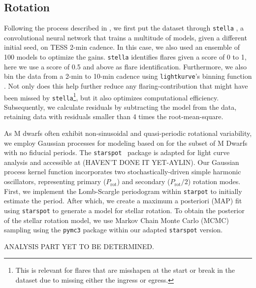 \subsection{Rotation}
Following the process described in \citet{023AJ....165..192G}, we first put the
dataset through \texttt{stella} \citep{FeinsteinFlare2020,FeinsteinStella2020},
a convolutional neural network that trains a multitude of models, given a
different initial seed, on TESS 2-min cadence. In this case, we also used an
ensemble of 100 models to optimize the gains. \texttt{stella} identifies flares
given a score of 0 to 1, here we use a score of 0.5 and above as flare
identification. Furthermore, we also bin the data from a 2-min to 10-min
cadence using \texttt{lightkurve}'s binning function
\citep{LightkurveCollaborationLightkurve2018,GeertBarentsenKeplerGO2020}. Not
only does this help further reduce any flaring-contribution that might have
been missed by \texttt{stella}\footnote{This is relevant for flares that are
misshapen at the start or break in the dataset due to missing either the
ingress or egress.}, but it also optimizes computational efficiency.
Subsequently, we calculate residuals by subtracting the model from the data,
retaining data with residuals smaller than 4 times the root-mean-square.

As M dwarfs often exhibit non-sinusoidal and quasi-periodic rotational
variability, we employ Gaussian processes for modeling based on
\citet{AngusInferring2018} for the subset of M Dwarfs with no fiducial periods.
The \texttt{starspot} \ package is adapted for light curve analysis
\citep{AngusRuthAngus2021,https://doi.org/10.5281/zenodo.7697238} and
accessible at (HAVEN'T DONE IT YET-AYLIN). Our Gaussian process kernel function
incorporates two stochastically-driven simple harmonic oscillators,
representing primary ($P_\textrm{rot}$) and secondary ($P_\textrm{rot}/2$)
rotation modes. First, we implement the Lomb-Scargle periodogram within
\texttt{starpot} to initially estimate the period. After which, we create a
maximum a posteriori (MAP) fit using \texttt{starspot} to generate a model for
stellar rotation. To obtain the posterior of the stellar rotation model, we use
Markov Chain Monte Carlo (MCMC) sampling using the \texttt{pymc3} package
\citep{SalvatierProbabilistic2016} within our adapted \texttt{starspot}
version. 

ANALYSIS PART YET TO BE DETERMINED.


